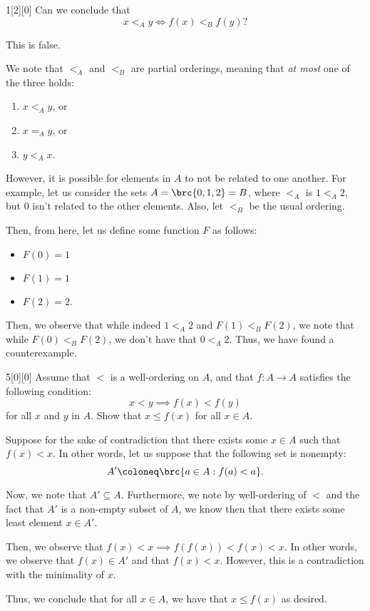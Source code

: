 \documentclass{article}
\begin{document}
\begin{hw}{1}[2][0]
	Can we conclude that
	\begin{equation*}
		x <_A y \iff f(x) <_B f(y)?
	\end{equation*}
\end{hw}
\begin{solution}
	This is false.
	
	We note that $<_A$ and $<_B$ are partial orderings, meaning that \textit{at most} one of the three holds:
	\begin{enumerate}
		\item $x <_A y$, or
		\item $x =_A y$, or
		\item $y <_A x$.
	\end{enumerate}

	However, it is possible for elements in $A$ to not be related to one another. For example, let us consider the sets $A = \brc{0, 1, 2} = B$, where $<_A$ is $1 <_A 2$, but $0$ isn't related to the other elements. Also, let $<_B$ be the usual ordering.
	
	Then, from here, let us define some function $F$ as follows:
	\begin{itemize}
		\item $F(0) = 1$
		\item $F(1) = 1$
		\item $F(2) = 2$.
	\end{itemize}

	Then, we observe that while indeed $1 <_A 2$ and $F(1) <_B F(2)$, we note that while $F(0) <_B F(2)$, we don't have that $0 <_A 2$. Thus, we have found a counterexample.
\end{solution}

\begin{hw}{5}[0][0]
	Assume that $<$ is a well-ordering on $A$, and that $f : A \rightarrow A$ satisfies the following condition:
	\begin{equation*}
		x < y \implies f(x) < f(y)
	\end{equation*}
	for all $x$ and $y$ in $A$. Show that $x \leq f(x)$ for all $x \in A$.
\end{hw}
\begin{solution}
	Suppose for the sake of contradiction that there exists some $x \in A$ such that $f(x) < x$. In other words, let us suppose that the following set is nonempty:
	\begin{equation*}
		A' \coloneq \brc{a \in A : f(a) < a}.
	\end{equation*}

	Now, we note that $A' \subseteq A$. Furthermore, we note by well-ordering of $<$ and the fact that $A'$ is a non-empty subset of $A$, we know then that there exists some least element $x \in A'$.
	
	Then, we observe that $f(x) < x \implies f(f(x)) < f(x) < x$. In other words, we observe that $f(x) \in A'$ and that $f(x) < x$. However, this is a contradiction with the minimality of $x$.
	
	Thus, we conclude that for all $x \in A$, we have that $x \leq f(x)$ as desired.
\end{solution}
\end{document}
